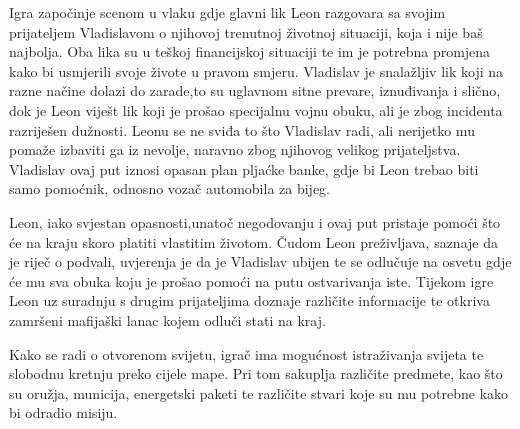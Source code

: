 Igra započinje scenom u vlaku gdje glavni lik Leon razgovara sa svojim prijateljem Vladislavom o njihovoj trenutnoj životnoj situaciji, koja i nije baš najbolja. Oba lika su u teškoj financijskoj situaciji te im je potrebna promjena kako bi usmjerili svoje živote u pravom smjeru. Vladislav je snalažljiv lik koji na razne načine dolazi do zarade,to su uglavnom sitne prevare, iznuđivanja i slično, dok je Leon viješt lik koji je prošao specijalnu vojnu obuku, ali je zbog incidenta razriješen dužnosti. Leonu se ne sviđa to što Vladislav radi, ali nerijetko mu pomaže izbaviti ga iz nevolje, naravno zbog njihovog velikog prijateljstva. Vladislav ovaj put iznosi opasan plan pljaćke banke, gdje bi Leon trebao biti samo pomoćnik, odnosno vozač automobila za bijeg.

Leon, iako svjestan opasnosti,unatoč negodovanju i ovaj put pristaje pomoći što će na kraju skoro platiti vlastitim životom. Čudom Leon preživljava, saznaje da je riječ o podvali, uvjerenja je da je Vladislav ubijen te se odlučuje na osvetu gdje će mu sva obuka koju je prošao pomoći na putu ostvarivanja iste. Tijekom igre Leon uz suradnju s drugim prijateljima doznaje različite informacije te otkriva zamršeni mafijaški lanac kojem odluči stati na kraj.

Kako se radi o otvorenom svijetu, igrač ima mogućnost istraživanja svijeta te slobodnu kretnju preko cijele mape. Pri tom sakuplja različite predmete, kao što su oružja, municija, energetski paketi te različite stvari koje su mu potrebne kako bi odradio misiju.





 